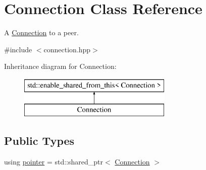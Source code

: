 \hypertarget{classConnection}{}\section{Connection Class Reference}
\label{classConnection}


A \mbox{\hyperlink{classConnection}{Connection}} to a peer.  




{\ttfamily \#include $<$connection.\+hpp$>$}

Inheritance diagram for Connection\+:\begin{figure}[H]
\begin{center}
\leavevmode
\includegraphics[height=2.000000cm]{classConnection}
\end{center}
\end{figure}
\subsection*{Public Types}
\begin{DoxyCompactItemize}
\item 
using \mbox{\hyperlink{classConnection_a1bb6cd8924ff091e9b053e3368735c9c}{pointer}} = std\+::shared\+\_\+ptr$<$ \mbox{\hyperlink{classConnection}{Connection}} $>$
\end{DoxyCompactItemize}
